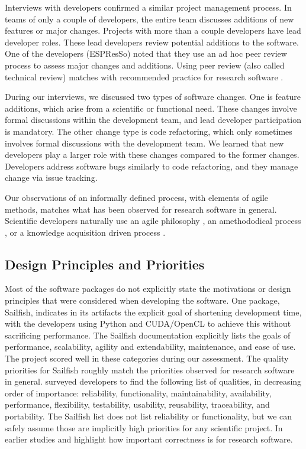 \documentclass[final, 3p, times, authoryear]{elsarticle}
\begin{document}
Interviews with developers confirmed a similar project management process. In
teams of only a couple of developers, the entire team discusses additions of new
features or major changes. Projects with more than a couple developers have lead
developer roles. These lead developers review potential additions to the
software. One of the developers (ESPResSo) noted that they use an ad hoc peer
review process to assess major changes and additions. Using peer review (also
called technical review) matches with recommended practice for research software
\citep{HerouxEtAl2008, Givler2020, OrvizEtAl2017, USGS2019}.

During our interviews, we discussed two types of software changes. One is
feature additions, which arise from a scientific or functional need. These
changes involve formal discussions within the development team, and lead
developer participation is mandatory. The other change type is code refactoring,
which only sometimes involves formal discussions with the development team. We
learned that new developers play a larger role with these changes compared to
the former changes. Developers address software bugs similarly to code
refactoring, and they manage change via issue tracking.

Our observations of an informally defined process, with elements of agile
methods, matches what has been observed for research software in general.
Scientific developers naturally use an agile philosophy \citep{AckroydEtAl2008,
CarverEtAl2007, EasterbrookAndJohns2009, Segal2005, HeatonAndCarver2015}, an
amethododical process \citep{Kelly2013}, or a knowledge acquisition driven
process \citep{Kelly2015}.

\subsection{Design Principles and Priorities} \label{Sec_DesPrincipAndPriorities}

Most of the software packages do not explicitly state the motivations or design
principles that were considered when developing the software. One package,
Sailfish, indicates in its artifacts the explicit goal of shortening development
time, with the developers using Python and CUDA/OpenCL to achieve this without
sacrificing performance. The Sailfish documentation explicitly lists the goals
of performance, scalability, agility and extendability, maintenance, and ease of
use. The project scored well in these categories during our assessment.  The
quality priorities for Sailfish roughly match the priorities observed for
research software in general. \citet{Nguyen-HoanEtAl2010} surveyed developers to
find the following list of qualities, in decreasing order of importance:
reliability, functionality, maintainability, availability, performance,
flexibility, testability, usability, reusability, traceability, and portability.
The Sailfish list does not list reliability or functionality, but we can safely
assume those are implicitly high priorities for any scientific project.  In
earlier studies \citet{KellyAndSanders2008} and \citet{CarverEtAl2007} highlight
how important correctness is for research software.
\end{document}
